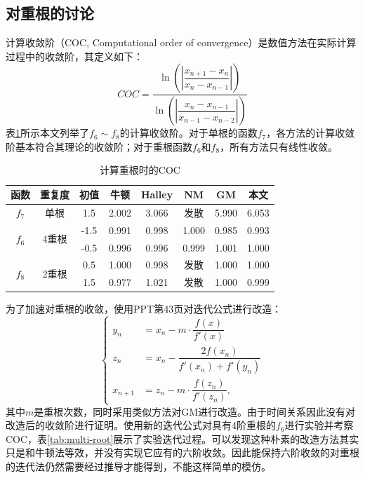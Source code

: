 \subsection{对重根的讨论}

计算收敛阶（COC, Computational order of convergence）\cite{cordero2007variants}是数值方法在实际计算过程中的收敛阶，其定义如下：
\begin{equation}
    COC = \dfrac{\ln\left( \left| \dfrac{x_{n+1} - x_n}{x_n - x_{n-1}} \right| \right)}{\ln\left( \left| \dfrac{x_n - x_{n-1}}{x_{n-1} - x_{n-2}} \right| \right)}
\end{equation}
表\ref{tab:coc}所示本文列举了$f_6 \sim f_8$的计算收敛阶。对于单根的函数$f_7$，各方法的计算收敛阶基本符合其理论的收敛阶；对于重根函数$f_6$和$f_8$，所有方法只有线性收敛。

\begin{table}[!htbp]
    \centering
    \caption{计算重根时的COC}
    \label{tab:coc}
    \begin{tabular}{cc|c|ccccc}
        \toprule
        函数 & 重复度 & 初值 & 牛顿 & Halley & NM & GM & 本文 \\
        \midrule
        $f_7$ & 单根 & 1.5 & 2.002 & 3.066 & 发散  & 5.990 & 6.053 \\
        \hline
        \multirow{2}{*}{$f_6$} & \multirow{2}{*}{4重根}
        & -1.5 & 0.991 & 0.998 & 1.000  & 0.985 & 0.993 \\
        & & -0.5 & 0.996 & 0.996 & 0.999  & 1.001 & 1.000 \\
        \hline
        \multirow{2}{*}{$f_8$} & \multirow{2}{*}{2重根}
        & 0.5 & 1.000 & 0.998 & 发散  & 1.000 & 1.000 \\
        &  & 1.5 & 0.977 & 1.021 & 发散  & 1.000 & 0.999 \\
        \bottomrule
    \end{tabular}
\end{table}

为了加速对重根的收敛，使用PPT第43页对迭代公式进行改造：
\begin{equation}
    \label{eq:my-m}
    \begin{cases}
        y_n &= x_n - m \cdot \dfrac{f(x)}{f'(x)} \\
        z_n &= x_n - \dfrac{2f(x_n)}{f'(x_n) + f'(y_n)} \\
        x_{n+1} &= z_n - m \cdot \dfrac{f(z_n)}{f'(z_n)},
    \end{cases}
\end{equation}
其中$m$是重根次数，同时采用类似方法对GM进行改造。由于时间关系因此没有对改造后的收敛阶进行证明。使用新的迭代公式对具有4阶重根的$f_6$进行实验并考察COC，表\ref{tab:multi-root}展示了实验迭代过程。可以发现这种朴素的改造方法其实只是和牛顿法等效，并没有实现它应有的六阶收敛。因此能保持六阶收敛的对重根的迭代法仍然需要经过推导才能得到，不能这样简单的模仿。


